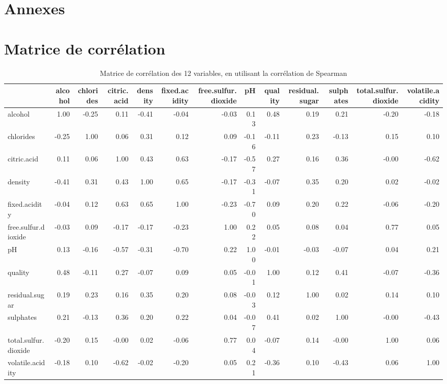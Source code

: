 \documentclass[11pt,a4paper]{article}
\begin{document}
\section{Annexes}
\appendix
\section{Matrice de corrélation}
\label{sec:cor}
\begin{table}[ht]
	\centering
	\begin{adjustbox}{width=1\textwidth}
	\begin{tabular}{lrrrrrrrrrrrr}
		\hline
		& alcohol & chlorides & citric.acid & density & fixed.acidity & free.sulfur.dioxide & pH & quality & residual.sugar & sulphates & total.sulfur.dioxide & volatile.acidity \\ 
		\hline
		alcohol & 1.00 & -0.25 & 0.11 & -0.41 & -0.04 & -0.03 & 0.13 & 0.48 & 0.19 & 0.21 & -0.20 & -0.18 \\ 
		chlorides & -0.25 & 1.00 & 0.06 & 0.31 & 0.12 & 0.09 & -0.16 & -0.11 & 0.23 & -0.13 & 0.15 & 0.10 \\ 
		citric.acid & 0.11 & 0.06 & 1.00 & 0.43 & 0.63 & -0.17 & -0.57 & 0.27 & 0.16 & 0.36 & -0.00 & -0.62 \\ 
		density & -0.41 & 0.31 & 0.43 & 1.00 & 0.65 & -0.17 & -0.31 & -0.07 & 0.35 & 0.20 & 0.02 & -0.02 \\ 
		fixed.acidity & -0.04 & 0.12 & 0.63 & 0.65 & 1.00 & -0.23 & -0.70 & 0.09 & 0.20 & 0.22 & -0.06 & -0.20 \\ 
		free.sulfur.dioxide & -0.03 & 0.09 & -0.17 & -0.17 & -0.23 & 1.00 & 0.22 & 0.05 & 0.08 & 0.04 & 0.77 & 0.05 \\ 
		pH & 0.13 & -0.16 & -0.57 & -0.31 & -0.70 & 0.22 & 1.00 & -0.01 & -0.03 & -0.07 & 0.04 & 0.21 \\ 
		quality & 0.48 & -0.11 & 0.27 & -0.07 & 0.09 & 0.05 & -0.01 & 1.00 & 0.12 & 0.41 & -0.07 & -0.36 \\ 
		residual.sugar & 0.19 & 0.23 & 0.16 & 0.35 & 0.20 & 0.08 & -0.03 & 0.12 & 1.00 & 0.02 & 0.14 & 0.10 \\ 
		sulphates & 0.21 & -0.13 & 0.36 & 0.20 & 0.22 & 0.04 & -0.07 & 0.41 & 0.02 & 1.00 & -0.00 & -0.43 \\ 
		total.sulfur.dioxide & -0.20 & 0.15 & -0.00 & 0.02 & -0.06 & 0.77 & 0.04 & -0.07 & 0.14 & -0.00 & 1.00 & 0.06 \\ 
		volatile.acidity & -0.18 & 0.10 & -0.62 & -0.02 & -0.20 & 0.05 & 0.21 & -0.36 & 0.10 & -0.43 & 0.06 & 1.00 \\ 
		\hline
	\end{tabular}
	\end{adjustbox}
\caption{Matrice de corrélation des 12 variables, en utilisant la corrélation de Spearman}
\label{table:cor}
\end{table}
\end{document}

